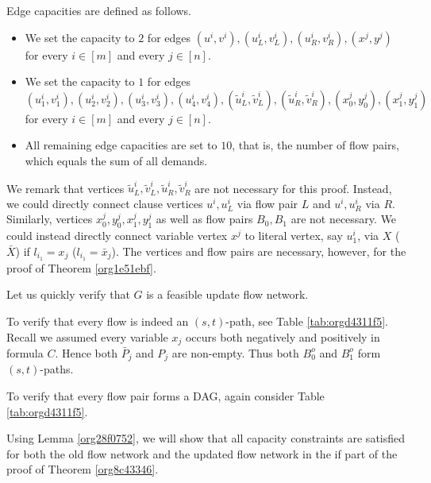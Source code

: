 \documentclass[fontsize=11pt,paper=a4]{book}
\begin{document}
Edge capacities are defined as follows.

\begin{itemize}
\item We set the capacity to \(2\) for edges \((u^i,v^i),(u_L^i,v_L^i),(u_R^i,v_R^i),(x^j,y^j)\) for every \(i\in[m]\) and every \(j\in[n]\).
\item We set the capacity to \(1\) for edges \((u_1^i,v_1^i),(u_2^i,v_2^i),(u_3^i,v_3^i),(u_4^i,v_4^i),(\tilde{u}_L^i,\tilde{v}_L^i),(\tilde{u}_R^i,\tilde{v}_R^i),(x_0^j,y_0^j),(x_1^j,y_1^j)\) for every \(i\in[m]\) and every \(j\in[n]\).
\item All remaining edge capacities are set to \(10\), that is, the number of flow pairs, which equals the sum of all demands.
\end{itemize}

We remark that vertices \(\tilde{u}_L^i,\tilde{v}_L^i,\tilde{u}_R^i,\tilde{v}_R^i\) are not necessary for this proof.
Instead, we could directly connect clause vertices \(u^i,u_L^i\) via flow pair \(L\) and \(u^i,u_R^i\) via \(R\).
Similarly, vertices \(x_0^j,y_0^j,x_1^j,y_1^j\) as well as flow pairs \(B_0,B_1\) are not necessary.
We could instead directly connect variable vertex \(x^j\) to literal vertex, say \(u_1^i\), via \(X\) (\(\bar{X}\)) if \(l_{i_1}=x_j\) (\(l_{i_1}=\bar{x}_j\)).
The vertices and flow pairs are necessary, however, for the proof of Theorem \ref{org1e51ebf}.

Let us quickly verify that \(G\) is a feasible update flow network.

To verify that every flow is indeed an \((s,t)\)-path, see Table \ref{tab:orgd4311f5}.
Recall we assumed every variable \(x_j\) occurs both negatively and positively in formula \(C\).
Hence both \(\bar{P}_j\) and \(P_j\) are non-empty.
Thus both \(B_0^o\) and \(B_1^o\) form \((s,t)\)-paths.

To verify that every flow pair forms a DAG, again consider Table \ref{tab:orgd4311f5}.

Using Lemma \ref{org28f0752}, we will show that all capacity constraints are satisfied for both the old flow network and the updated flow network in the if part of the proof of Theorem \ref{org8c43346}.
\end{document}
